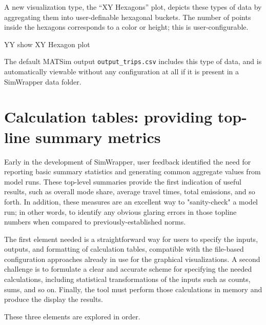 A new visualization type, the ``XY Hexagons'' plot, depicts these types of data by aggregating them into user-definable hexagonal buckets. The number of points inside the hexagons corresponds to a color or height; this is user-configurable.

YY show XY Hexagon plot

The default MATSim output \texttt{output\_trips.csv} includes this type of data, and is automatically viewable without any configuration at all if it is present in a SimWrapper data folder.


\hypertarget{calculation-tables}{%
\section{Calculation tables: providing top-line summary metrics}\label{calculation-tables}}

Early in the development of SimWrapper, user feedback identified the need for reporting basic summary statistics and generating common aggregate values from model runs. These top-level summaries provide the first indication of useful results, such as overall mode share, average travel times, total emissions, and so forth. In addition, these measures are an excellent way to "sanity-check" a model run; in other words, to identify any obvious glaring errors in those topline numbers when compared to previously-established norms.

The first element needed is a straightforward way for users to specify the inputs, outputs, and formatting of calculation tables, compatible with the file-based configuration approaches already in use for the graphical visualizations. A second challenge is to formulate a clear and accurate scheme for specifying the needed calculations, including statistical transformations of the inputs such as counts, sums, and so on. Finally, the tool must perform those calculations in memory and produce the display the results.

These three elements are explored in order.


